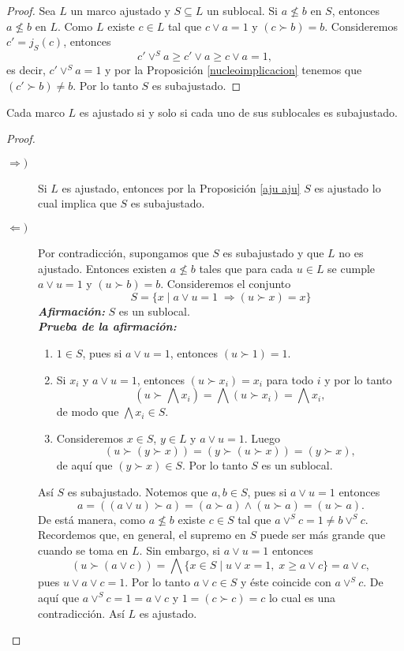 \documentclass{comunicaciones}
\begin{document}
\begin{proof}
    Sea $L$ un marco ajustado y $S\subseteq L$ un sublocal. Si $a\nleq b$ en $S$, entonces $a\nleq b$ en $L$. Como $L$ existe $c\in L$ tal que $c\vee a=1$ y $(c\succ b)=b$. Consideremos $c'=j_S(c)$, entonces 
    \[
    c'\vee^S a\geq c'\vee a\geq c\vee a=1,
    \]es decir, $c'\vee^S a=1$ y por la Proposición \ref{nucleoimplicacion} tenemos que $(c'\succ b)\neq b$. Por lo tanto $S$ es subajustado.
\end{proof}

\begin{thm}\label{aju saju}
    Cada marco $L$ es ajustado si y solo si cada uno de sus sublocales es subajustado.
\end{thm}

\begin{proof}
    \begin{description}
        \item[$\Rightarrow )$] Si $L$ es ajustado, entonces por la Proposición \ref{aju aju} $S$ es ajustado lo cual implica que $S$ es subajustado. 
        \item[$\Leftarrow )$] Por contradicción, supongamos que $S$ es subajustado y que $L$ no es ajustado. Entonces existen $a\nleq b$ tales que para cada $u\in L$ se cumple $a\vee u=1$ y $(u\succ b)=b$. Consideremos el conjunto 
        \[
        S=\{x\mid a\vee u=1\; \Rightarrow (u\succ x)=x\}
        \]
        \emph{\textbf{Afirmación:}} $S$ es un sublocal.\\

        \noindent
        \emph{\textbf{Prueba de la afirmación:}} 
        \begin{enumerate}
            \item $1\in S$, pues si $a\vee u=1$, entonces $(u\succ 1)=1$.
            \item Si $x_i$ y $a\vee u=1$, entonces $(u\succ x_i)=x_i$ para todo $i$ y por lo tanto
            \[
            (u\succ \bigwedge x_i)=\bigwedge (u\succ x_i)=\bigwedge x_i,
            \]
            de modo que $\bigwedge x_i\in S$.
            \item Consideremos $x\in S$, $y\in L$ y $a\vee u=1$. Luego
            \[
            (u\succ (y\succ x))=(y\succ (u\succ x))=(y\succ x),
            \]
            de aquí que $(y\succ x)\in S$. Por lo tanto $S$ es un sublocal.
        \end{enumerate}
        Así $S$ es subajustado. Notemos que $a, b\in S$, pues si $a\vee u=1$ entonces 
        \[
        a=((a\vee u)\succ a)=(a\succ a)\wedge (u\succ a)=(u\succ a).
        \]
        De está manera, como $a\nleq b$ existe $c\in S$ tal que $a\vee^S c=1\neq b\vee^S c$. Recordemos que, en general, el supremo en $S$ puede ser más grande que cuando se toma en $L$. Sin embargo, si $a\vee u=1$ entonces
        \[
        (u\succ (a\vee c))=\bigwedge \{x\in S\mid u\vee x=1, \; x\geq a\vee c\}=a\vee c,
        \]
        pues $u\vee a\vee c=1$. Por lo tanto $a\vee c\in S$ y éste coincide con $a\vee^S c$. De aquí que $a\vee^Sc=1=a\vee c$ y $1=(c\succ c)=c$ lo cual es una contradicción. Así $L$ es ajustado.
    \end{description}
\end{proof}
\end{document}
